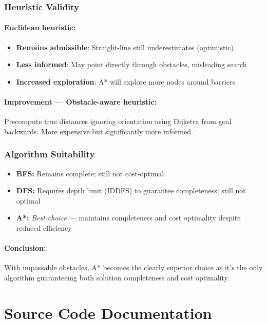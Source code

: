 \documentclass[11pt,a4paper]{article}
\begin{document}
\subsubsection{Heuristic Validity}
\paragraph{Euclidean heuristic:}
\begin{itemize}[leftmargin=1.5cm,itemsep=0.1em]
    \item \textbf{Remains admissible}: Straight-line still underestimates (optimistic)
    \item \textbf{Less informed}: May point directly through obstacles, misleading search
    \item \textbf{Increased exploration}: A* will explore more nodes around barriers
\end{itemize}

\paragraph{Improvement --- Obstacle-aware heuristic:}
Precompute true distances ignoring orientation using Dijkstra from goal backwards. More expensive but significantly more informed.

\subsubsection{Algorithm Suitability}
\begin{itemize}[leftmargin=1.5cm,itemsep=0.1em]
    \item \textbf{BFS:} Remains complete; still not cost-optimal
    \item \textbf{DFS:} Requires depth limit (IDDFS) to guarantee completeness; still not optimal
    \item \textbf{A*:} \textit{Best choice} --- maintains completeness and cost optimality despite reduced efficiency
\end{itemize}

\paragraph{Conclusion:}
With impassable obstacles, A* becomes the clearly superior choice as it's the only algorithm guaranteeing both solution completeness and cost optimality.
\newpage
\appendix
\section{Source Code Documentation}
\end{document}
